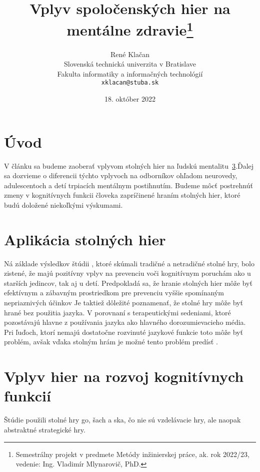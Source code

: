 \documentclass[10pt,oneside,slovak,a4paper]{article}
\title{Vplyv spoločenských hier na mentálne zdravie\thanks{Semestrálny projekt v predmete Metódy inžinierskej práce, ak. rok 2022/23, vedenie: Ing. Vladimír Mlynarovič, PhD.}} %
\author{René Klačan\\[2pt]
	{\small Slovenská technická univerzita v Bratislave}\\
	{\small Fakulta informatiky a informačných technológií}\\
	{\small \texttt{xklacan@stuba.sk}}
	}
\date{\small 18. október 2022}
\begin{document}
\maketitle
\begin{abstract}
\end{abstract}



\section{Úvod}

V článku sa budeme zaoberať vplyvom stolných hier na ľudskú mentalitu~\ref{hry_kognitivne_funkcie}.Ďalej sa dozvieme o diferencii týchto vplyvoch na odborníkov ohľadom neurovedy, adulescentoch a detí trpiacích mentálnym postihnutím. Budeme môcť postrehnúť zmeny v kognitívnych funkcii človeka zapríčinené hraním stolných hier, ktoré budú doložené niekoľkými výskumami.


\section{Aplikácia stolných hier} \label{aplikacie_hier}
Ná základe výsledkov štúdii \cite{Nakao:BG}, ktoré skúmali tradičné a netradičné stolné hry, bolo zistené, že majú pozitívny vplyv na prevenciu voči kognitívnym poruchám ako u starších jedincov, tak aj u detí.
Predpokladá sa, že hranie stolných hier môže byť efektívnym a zábavným prostriedkom pre prevenciu vyššie spomínaným nepriaznivých účinkov \cite{Edu:GFH}
Je taktiež dôležité poznamenať, že stolné hry môže byť hrané bez použitia jazyka. V porovnaní s terapeutickými sedeniami, ktoré pozostávajú hlavne z používania jazyka ako hlavného dorozumievacieho média. Pri ľuďoch, ktorí nemajú dostatočne rozvinuté jazykové funkcie toto môže byť problém, avšak vďaka stolným hrám je možné tento problém predísť \cite{Charlier:2013}.

\section{Vplyv hier na rozvoj kognitívnych funkcií} \label{hry_kognitivne_funkcie}
Štúdie \cite{Panphunpho:2013} použili stolné hry go, šach a ska, čo nie sú vzdelávacie hry, ale naopak abstraktné strategické hry.
\end{document}
